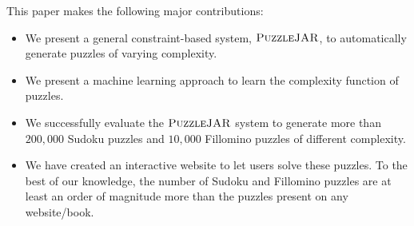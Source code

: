This paper makes the following major contributions:

\begin{itemize}
\item We present a general constraint-based system, $\textsc{PuzzleJAR}$, to automatically generate puzzles of varying complexity.
\item We present a machine learning approach to learn the
  complexity function of puzzles.
\item We successfully evaluate the $\textsc{PuzzleJAR}$ system to generate
  more than $200,000$ Sudoku puzzles and $10,000$ Fillomino puzzles of
  different complexity.
\item We have created an interactive website to let users solve these
  puzzles. To the best of our knowledge, the number of Sudoku and
  Fillomino puzzles are at least an order of magnitude more than the
  puzzles present on any website/book.
\end{itemize}
